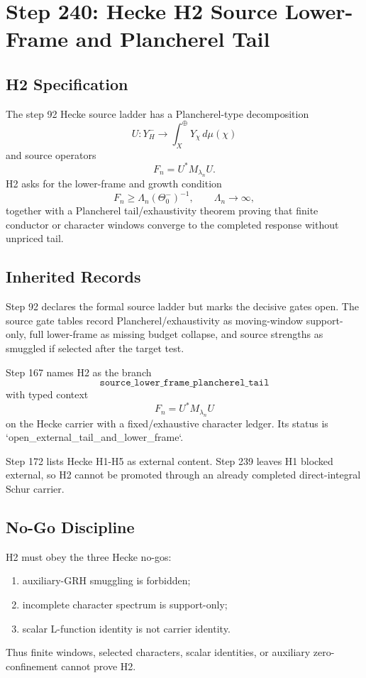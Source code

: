 \section*{Step 240: Hecke H2 Source Lower-Frame and Plancherel Tail}

\subsection*{H2 Specification}

The step 92 Hecke source ladder has a Plancherel-type decomposition
\[
U:Y_H^- \longrightarrow \int_X^\oplus Y_\chi\,d\mu(\chi)
\]
and source operators
\[
F_n = U^*M_{\lambda_n}U.
\]
H2 asks for the lower-frame and growth condition
\[
F_n \geq \Lambda_n(\Theta_0^-)^{-1},\qquad \Lambda_n\to\infty,
\]
together with a Plancherel tail/exhaustivity theorem proving that finite conductor or character windows converge to the completed response without unpriced tail.

\subsection*{Inherited Records}

Step 92 declares the formal source ladder but marks the decisive gates open. The source gate tables record Plancherel/exhaustivity as moving-window support-only, full lower-frame as missing budget collapse, and source strengths as smuggled if selected after the target test.

Step 167 names H2 as the branch
\[
\texttt{source\_lower\_frame\_plancherel\_tail}
\]
with typed context
\[
F_n=U^*M_{\lambda_n}U
\]
on the Hecke carrier with a fixed/exhaustive character ledger. Its status is `open_external_tail_and_lower_frame`.

Step 172 lists Hecke H1-H5 as external content. Step 239 leaves H1 blocked external, so H2 cannot be promoted through an already completed direct-integral Schur carrier.

\subsection*{No-Go Discipline}

H2 must obey the three Hecke no-gos:
\begin{enumerate}
  \item auxiliary-GRH smuggling is forbidden;
  \item incomplete character spectrum is support-only;
  \item scalar L-function identity is not carrier identity.
\end{enumerate}
Thus finite windows, selected characters, scalar identities, or auxiliary zero-confinement cannot prove H2.

